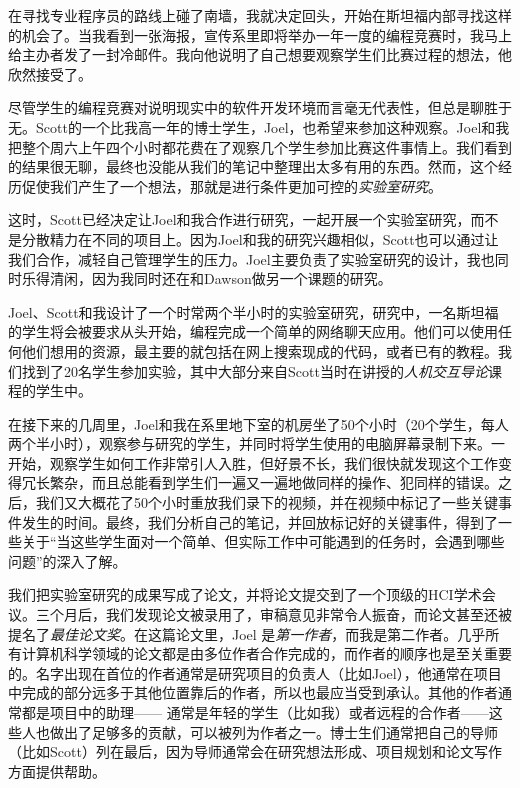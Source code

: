 \documentclass[letter,12pt]{book}
\begin{document}
\begin{CJK}{UTF8}{gbsn}
\breakline

在寻找专业程序员的路线上碰了南墙，我就决定回头，开始在斯坦福内部寻找这样的机会了。当我看到一张海报，宣传系里即将举办一年一度的编程竞赛时，我马上给主办者发了一封冷邮件。我向他说明了自己想要观察学生们比赛过程的想法，他欣然接受了。

尽管学生的编程竞赛对说明现实中的软件开发环境而言毫无代表性，但总是聊胜于无。Scott的一个比我高一年的博士学生，Joel，也希望来参加这种观察。Joel和我把整个周六上午四个小时都花费在了观察几个学生参加比赛这件事情上。我们看到的结果很无聊，最终也没能从我们的笔记中整理出太多有用的东西。然而，这个经历促使我们产生了一个想法，那就是进行条件更加可控的\emph{实验室研究}。

这时，Scott已经决定让Joel和我合作进行研究，一起开展一个实验室研究，而不是分散精力在不同的项目上。因为Joel和我的研究兴趣相似，Scott也可以通过让我们合作，减轻自己管理学生的压力。Joel主要负责了实验室研究的设计，我也同时乐得清闲，因为我同时还在和Dawson做另一个课题的研究。

Joel、Scott和我设计了一个时常两个半小时的实验室研究，研究中，一名斯坦福的学生将会被要求从头开始，编程完成一个简单的网络聊天应用。他们可以使用任何他们想用的资源，最主要的就包括在网上搜索现成的代码，或者已有的教程。我们找到了20名学生参加实验，其中大部分来自Scott当时在讲授的\emph{人机交互导论}课程的学生中。

在接下来的几周里，Joel和我在系里地下室的机房坐了50个小时（20个学生，每人两个半小时），观察参与研究的学生，并同时将学生使用的电脑屏幕录制下来。一开始，观察学生如何工作非常引人入胜，但好景不长，我们很快就发现这个工作变得冗长繁杂，而且总能看到学生们一遍又一遍地做同样的操作、犯同样的错误。之后，我们又大概花了50个小时重放我们录下的视频，并在视频中标记了一些关键事件发生的时间。最终，我们分析自己的笔记，并回放标记好的关键事件，得到了一些关于“当这些学生面对一个简单、但实际工作中可能遇到的任务时，会遇到哪些问题”的深入了解。

我们把实验室研究的成果写成了论文，并将论文提交到了一个顶级的HCI学术会议。三个月后，我们发现论文被录用了，审稿意见非常令人振奋，而论文甚至还被提名了\emph{最佳论文奖}。在这篇论文里，Joel 是\emph{第一作者}，而我是第二作者。几乎所有计算机科学领域的论文都是由多位作者合作完成的，而作者的顺序也是至关重要的。名字出现在首位的作者通常是研究项目的负责人（比如Joel），他通常在项目中完成的部分远多于其他位置靠后的作者，所以也最应当受到承认。其他的作者通常都是项目中的助理—— 通常是年轻的学生（比如我）或者远程的合作者——这些人也做出了足够多的贡献，可以被列为作者之一。博士生们通常把自己的导师（比如Scott）列在最后，因为导师通常会在研究想法形成、项目规划和论文写作方面提供帮助。


\end{CJK}
\end{document}
